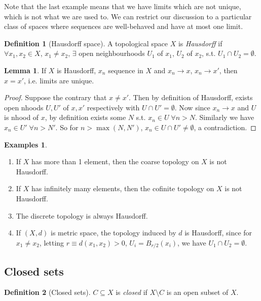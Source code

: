 \documentclass[a4paper,11pt]{article}
\theoremstyle{definition}
\newtheorem*{defn}{Definition}
\newtheorem*{exs}{Examples}
\newtheorem*{lem}{Lemma}
\numberwithin{equation}{section}
\begin{document}
Note that the last example means that we have limits which are not unique, which is not what we are used to. We can restrict our discussion to a particular class of spaces where sequences are well-behaved and have at most one limit.

\begin{defn}[Hausdorff space]
    A topological space $X$ is \emph{Hausdorff} if $\forall x_1,x_2\in X$, $x_1\neq x_2$, $\exists$ open neighbourhoods $U_1$ of $x_1$, $U_2$ of $x_2$, s.t. $U_1\cap U_2=\emptyset$.
\end{defn}

\begin{lem}
If $X$ is Hausdorff, $x_n$ sequence in $X$ and $x_n\rightarrow x$, $x_n\rightarrow x'$, then $x=x'$, i.e. limits are unique.
\end{lem}
\begin{proof}
Suppose the contrary that $x\neq x'$. Then by definition of Hausdorff, exists open nhoods $U,U'$ of $x,x'$ respectively with $U\cap U'=\emptyset$. Now since $x_n\rightarrow x$ and $U$ is nhood of $x$, by definition exists some $N$ s.t. $x_n\in U\;\forall n>N$. Similarly we have $x_n\in U'\;\forall n>N'$. So for $n>\max(N,N')$, $x_n\in U\cap U'\neq\emptyset$, a contradiction.
\end{proof}

\begin{exs}
\leavevmode
\begin{enumerate}
    \item If $X$ has more than 1 element, then the coarse topology on $X$ is not Hausdorff.
    \item If $X$ has infinitely many elements, then the cofinite topology on $X$ is not Hausdorff.
    \item The discrete topology is always Hausdorff.
    \item If $(X,d)$ is metric space, the topology induced by $d$ is Hausdorff, since for $x_1\neq x_2$, letting $r\equiv d(x_1,x_2)>0$, $U_i=B_{r/2}(x_i)$, we have $U_1\cap U_2=\emptyset$.
\end{enumerate}
\end{exs}

\subsection{Closed sets}
\begin{defn}[Closed sets]
    $C\subseteq X$ is \emph{closed} if $X\setminus C$ is an open subset of $X$.
\end{defn}
\end{document}
